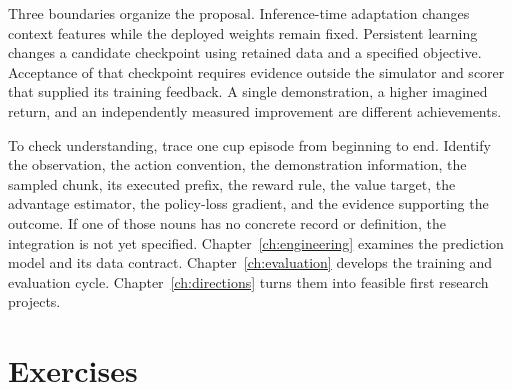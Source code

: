 Three boundaries organize the proposal. Inference-time adaptation changes context features while the deployed weights remain fixed. Persistent learning changes a candidate checkpoint using retained data and a specified objective. Acceptance of that checkpoint requires evidence outside the simulator and scorer that supplied its training feedback. A single demonstration, a higher imagined return, and an independently measured improvement are different achievements.

To check understanding, trace one cup episode from beginning to end. Identify the observation, the action convention, the demonstration information, the sampled chunk, its executed prefix, the reward rule, the value target, the advantage estimator, the policy-loss gradient, and the evidence supporting the outcome. If one of those nouns has no concrete record or definition, the integration is not yet specified. Chapter~\ref{ch:engineering} examines the prediction model and its data contract. Chapter~\ref{ch:evaluation} develops the training and evaluation cycle. Chapter~\ref{ch:directions} turns them into feasible first research projects.

\FloatBarrier

\section{Exercises}
\FloatBarrier
